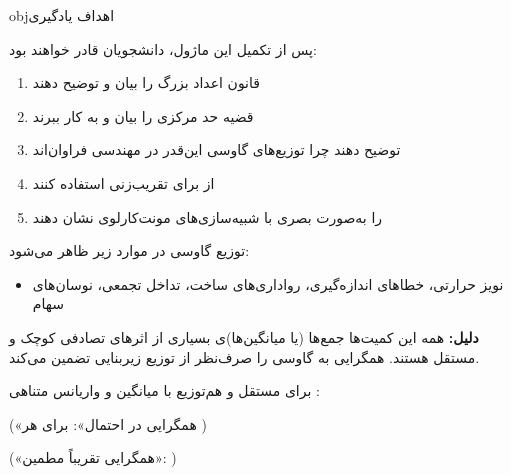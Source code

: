 \begin{PSbox}[unbreakable]{obj}{اهداف یادگیری}

پس از تکمیل این ماژول، دانشجویان قادر خواهند بود:

\begin{enumerate}
\def\labelenumi{\arabic{enumi}.}
\tightlist
\item
  قانون اعداد بزرگ را بیان و توضیح دهند
\item
  قضیه حد مرکزی را بیان و به کار ببرند
\item
  توضیح دهند چرا توزیع‌های گاوسی این‌قدر در مهندسی فراوان‌اند
\item
  از  برای تقریب‌زنی استفاده کنند
\item
   را به‌صورت بصری با شبیه‌سازی‌های مونت‌کارلوی  نشان دهند
\end{enumerate}

\end{PSbox}


توزیع گاوسی در موارد زیر ظاهر می‌شود:

\begin{itemize}
\tightlist
\item
  نویز حرارتی، خطاهای اندازه‌گیری، رواداری‌های ساخت، تداخل تجمعی، نوسان‌های سهام
\end{itemize}

\textbf{دلیل:} همه این کمیت‌ها جمع‌ها (یا میانگین‌ها)ی بسیاری از اثرهای تصادفی کوچک و مستقل هستند.  همگرایی به گاوسی را صرف‌نظر از توزیع زیربنایی تضمین می‌کند.



برای  مستقل و هم‌توزیع  با میانگین \lr{$\mu$} و واریانس متناهی :


(«همگرایی در احتمال»:  برای هر )



(«همگرایی تقریباً مطمین»: )

